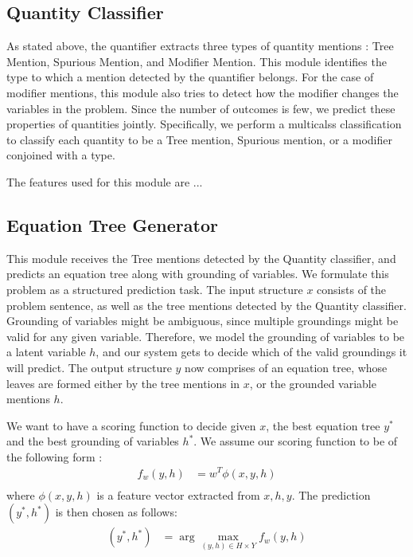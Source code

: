   \subsection{Quantity Classifier}
    As stated above, the quantifier extracts three types of quantity
    mentions : Tree Mention, Spurious Mention, and Modifier
    Mention. This module identifies the type to which a mention
    detected by the quantifier belongs. For the case of modifier
    mentions, this module also tries to detect how the modifier
    changes the variables in the problem. Since the number of outcomes
    is few, we predict these properties of quantities
    jointly. Specifically, we perform a multicalss classification to
    classify each quantity to be a Tree mention, Spurious mention, or
    a modifier conjoined with a type.

    The features used for this module are ...
    
  \subsection{Equation Tree Generator}

    This module receives the Tree mentions detected by the Quantity
    classifier, and predicts an equation tree along with grounding of
    variables. We formulate this problem as a structured prediction
    task.  The input structure $x$ consists of the problem sentence,
    as well as the tree mentions detected by the Quantity
    classifier. Grounding of variables might be ambiguous, since
    multiple groundings might be valid for any given
    variable. Therefore, we model the grounding of variables to be a
    latent variable $h$, and our system gets to decide which of the
    valid groundings it will predict. The output structure $y$ now comprises
    of an equation tree, whose leaves are formed either by the tree mentions
    in $x$, or the grounded variable mentions $h$.

    We want to have a scoring function to decide given $x$, the best
    equation tree $y^*$ and the best grounding of variables $h^*$. We
    assume our scoring function to be of the following form :
    \begin{align*}
      f_w(y, h) &= w^T\phi(x, y, h) \\ 
    \end{align*}  
    where $\phi(x, y, h)$ is a feature vector extracted from $x, h,
    y$. The prediction $(y^*, h^*)$ is then chosen as follows:
    \begin{align*}
      (y^*, h^*) &= \arg\max_{(y, h)\in H \times Y} f_w(y, h)
    \end{align*}


